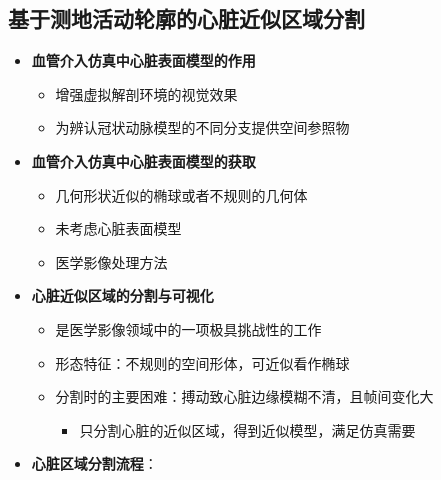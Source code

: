 \subsection[心脏分割]{基于测地活动轮廓的心脏近似区域分割}

\begin{frame}
\begin{itemize}
\item \textbf{血管介入仿真中心脏表面模型的作用}
\begin{itemize}
\item 增强虚拟解剖环境的视觉效果
\item 为辨认冠状动脉模型的不同分支提供空间参照物
\end{itemize}
\pause \item \textbf{血管介入仿真中心脏表面模型的获取}
\begin{itemize}
\item 几何形状近似的椭球或者不规则的几何体
\item 未考虑心脏表面模型
\item 医学影像处理方法
\end{itemize}
\pause \item \textbf{心脏近似区域的分割与可视化}
\begin{itemize}
\item 是医学影像领域中的一项极具挑战性的工作
\item 形态特征：不规则的空间形体，可近似看作椭球
\item 分割时的主要困难：搏动致心脏边缘模糊不清，且帧间变化大
\begin{itemize}
\item 只分割心脏的近似区域，得到近似模型，满足仿真需要
\end{itemize}
\end{itemize}
\end{itemize}
\end{frame}

\begin{frame}
\begin{itemize}
  \item \textbf{心脏区域分割流程}：
\end{itemize}
\begin{figure}[t]
\centering

\end{figure}
\end{frame}

